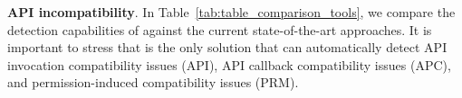\begin{comment}
These research efforts primarily focused on
behavioral differences when an app is installed on different
operating systems and/or hardware platforms.  They mainly
rely on hardware specifications and changes in the Android
documentation to uncover potential compatibility or
behavioral issues. Therefore, these approaches are not
useful when such platform related information is incomplete,
inconsistent, or unavailable.  Furthermore,  applying these
approaches to test an application on the entire vast
hardware ecosystem of Android devices may not be feasible
due to exponentially large system configurations.  Our work,
on the other hand, focuses on a more tractable and important
problem due to API evolution and how it can affect the apps
and their performance regardless of the operating system
distribution or the hardware the applications are running
on.

\end{comment}

\textbf{API incompatibility}. 
In Table~\ref{tab:table_comparison_tools}, we compare the
detection capabilities of \textsc{\@approach} against the
current state-of-the-art approaches. It is important to
stress that \@approach is the only solution that 
can automatically detect API invocation
compatibility issues (API), API callback compatibility
issues (APC), and permission-induced compatibility issues
(PRM). %

\begin{table}%
    
\end{table}

